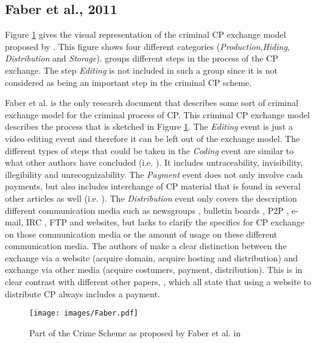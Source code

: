 \documentclass{sig-alternate-br}
\begin{document}
\subsection{Faber et al., 2011 \cite{en2011phishing}}
Figure \ref{fig:faber_01} gives the visual representation of the criminal CP exchange model proposed by \cite{en2011phishing}. This figure shows four different categories (\textit{Production},\textit{Hiding}, \textit{Distribution} and \textit{Storage}). \cite{en2011phishing} groups different steps in the process of the CP exchange. The step \textit{Editing} is not included in such a group since it is not considered as being an important step in the criminal CP scheme.

Faber et al. \cite{en2011phishing} is the only research document that describes some sort of criminal exchange model for the criminal process of CP. This criminal CP exchange model \cite{en2011phishing} describes the process that is sketched in Figure \ref{fig:faber_01}. The \textit{Editing} event is just a video editing event and therefore it can be left out of the exchange model. The different types of steps that could be taken in the \textit{Coding} event are similar to what other authors have concluded (i.e. \cite{wortley2006child, jenkins2001beyond,wolak2005child}). It includes untraceability, invisibility, illegibility and unrecognizability. The \textit{Payment} event does not only involve cash payments, but also includes interchange of CP material that is found in several other articles as well (i.e. \cite{wortley2006child,wijk2009achter,wolak2005child}). The \textit{Distribution} event only covers the description different communication media such as newsgroups \cite{site:usenet}, bulletin boards \cite{site:bulletin}, P2P \cite{site:p2p}, e-mail, IRC \cite{site:IRC}, FTP \cite{site:FTP} and websites, but lacks to clarify the specifics for CP exchange on those communication media or the amount of usage on these different communication media. The authors of \cite{en2011phishing} make a clear distinction between the exchange via a website (acquire domain, acquire hosting and distribution) and exchange via other media (acquire costumers, payment, distribution). This is in clear contrast with different other papers, \cite{wortley2006child,wijk2009achter,callanan2009internet}, which all state that using a website to distribute CP always includes a payment.

\begin{figure}[ht]
\centering
\texttt{[image: images/Faber.pdf]}
\caption{Part of the Crime Scheme as proposed by Faber et al. in \cite{en2011phishing}}
\label{fig:faber_01}
\end{figure}
\end{document}
